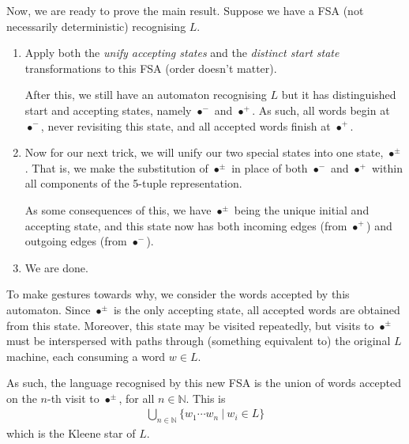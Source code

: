 \documentclass[a4paper]{article}
\begin{document}
Now, we are ready to prove the main result.
Suppose we have a FSA (not necessarily deterministic)
recognising $L$.
\begin{enumerate}
  \item 
Apply both the \textit{unify accepting states} and the \textit{distinct start state}
transformations to this FSA (order doesn't matter).

After this, we still have an automaton recognising $L$ but it has distinguished start and accepting states, namely $\bullet^-$ and $\bullet^+$.
As such, all words begin at $\bullet^-$, never revisiting this state,
and all accepted words finish at $\bullet^+$. 
  \item 
    Now for our next trick, we will
    unify our two special states into one state, $\bullet^\pm$.
    That is, we make the substitution of $\bullet^\pm$ in place of
    both $\bullet^-$ and $\bullet^+$ within all components of the 5-tuple representation.

    As some consequences of this, we have $\bullet^\pm$ being the unique initial and accepting state, and this state now has both incoming edges (from $\bullet^+$) and outgoing edges (from $\bullet^-$).

  \item
    We are done.

\end{enumerate}

To make gestures towards why, we consider the words accepted by this automaton.
Since $\bullet^\pm$ is the only accepting state, all accepted words are obtained
from this state.
Moreover, this state may be visited repeatedly, but visits to $\bullet^\pm$
must be interspersed with paths through (something equivalent to) the original $L$ machine, each consuming a word $w \in L$.

As such, the language recognised by this new FSA is the union of words accepted on the $n$-th visit to $\bullet^\pm$, for all $n \in \mathbb N$. This is
\begin{align*}
  \bigcup_{n \in \mathbb N} \big\{ w_1\cdots{}w_n ~\big|~ w_i \in L \big\}
\end{align*}
which is the Kleene star of $L$.

%
\end{document}
